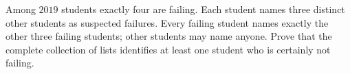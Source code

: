 Among $2019$ students exactly four are failing. Each student names three distinct other students as suspected failures. Every failing student names exactly the other three failing students; other students may name anyone. Prove that the complete collection of lists identifies at least one student who is certainly not failing.
